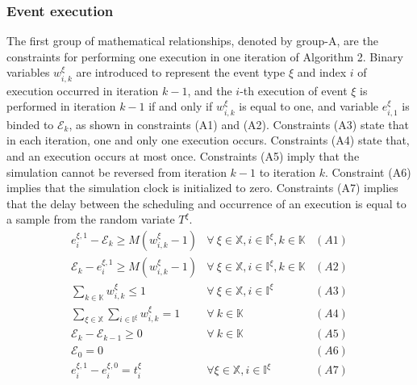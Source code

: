 \documentclass[]{interact}
\theoremstyle{plain}%
\theoremstyle{definition}
\theoremstyle{remark}
\begin{document}
\subsubsection{Event execution} \label{sec:const_A}
The first group of mathematical relationships, denoted by group-A, are the constraints for performing one execution in one iteration of Algorithm 2. Binary variables $w^{\xi}_{i,k}$ are introduced to represent the event type $\xi$ and index $i$ of execution occurred in iteration $k-1$, and the $i$-th execution of event $\xi$ is performed in iteration $k-1$ if and only if $w^{\xi}_{i,k}$ is equal to one, and variable $e^{\xi}_{i,1}$ is binded to $\mathcal{E}_k$, as shown in constraints (A1) and (A2). Constraints (A3) state that in each iteration, one and only one execution occurs. Constraints (A4) state that, and an execution occurs at most once. 
Constraints (A5) imply that the simulation cannot be reversed from iteration $k-1$ to iteration $k$. 
Constraint (A6) implies that the simulation clock is initialized to zero. Constraints (A7) implies that the delay between the scheduling and occurrence of an execution is equal to a sample from the random variate $T^{\xi}$.
\begin{eqnarray}
e^{\xi,1}_i-\mathcal{E}_k\ge M(w^{\xi}_{i,k}-1) & \forall\ \xi\in\mathbb{X},i\in \mathbb{I}^{\xi},k\in \mathbb{K}&(A1)\nonumber\\
\mathcal{E}_k-e^{\xi,1}_i\ge M(w^{\xi}_{i,k}-1) & \forall\ \xi\in\mathbb{X},i\in \mathbb{I}^{\xi},k\in \mathbb{K}&(A2)\nonumber\\
\sum_{k\in \mathbb{K}} w^{\xi}_{i,k} \le 1& \forall\ \xi\in\mathbb{X},i\in \mathbb{I}^{\xi}&(A3)\nonumber\\
\sum_{\xi\in \mathbb{X}}\sum_{i\in \mathbb{I}^{\xi}} w^{\xi}_{i,k} =1&\forall\ k\in \mathbb{K}&(A4)\nonumber\\
\mathcal{E}_{k}-\mathcal{E}_{k-1}\ge 0&\forall\ k\in \mathbb{K}&(A5)\nonumber\\
\mathcal{E}_0 = 0&&(A6)\nonumber\\
e^{\xi,1}_{i} - e^{\xi,0}_{i} = t^{\xi}_{i} & \forall \xi\in\mathbb{X}, i\in \mathbb{I}^{\xi}&(A7) \nonumber
\end{eqnarray}
\end{document}
